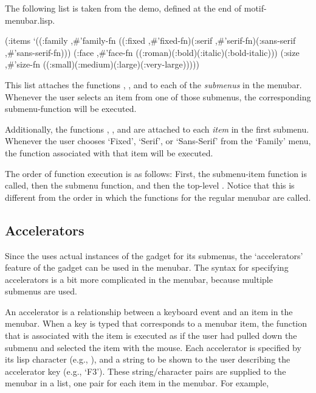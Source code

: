 The following  list is taken from the  demo,
defined at the end of motif-menubar.lisp.

\begin{programexample}
(:items
 `((:family ,\#'family-fn
	    ((:fixed ,\#'fixed-fn)(:serif ,\#'serif-fn)(:sans-serif ,\#'sans-serif-fn)))
   (:face ,\#'face-fn
	  ((:roman)(:bold)(:italic)(:bold-italic)))
   (:size ,\#'size-fn
	  ((:small)(:medium)(:large)(:very-large)))))
\end{programexample}

This  list attaches the functions ,
, and  to each of the {\it submenus}
in the menubar.  Whenever the user selects an item from one of those submenus,
the corresponding submenu-function will be executed.

Additionally, the functions , ,
and  are attached to each {\it item} in the first
submenu.  Whenever the user chooses `Fixed', `Serif', or `Sans-Serif' from
the `Family' menu, the function associated with that item will be executed.

The order of function execution is as follows:  First, the submenu-item
function is called, then the submenu function, and then the top-level
.  Notice that this is different from the order in
which the functions for the regular menubar are called.


\subsection{Accelerators}
\label{mmbar-accelerators}

Since the  uses actual instances of the 
gadget for its submenus, the `accelerators' feature of the 
gadget can be used in the menubar.  The syntax for specifying accelerators
is a bit more complicated in the menubar, because multiple submenus are used.

An accelerator is a relationship between a keyboard event and an item in
the menubar.  When a key is typed that corresponds to a menubar item, the
function that is associated with the item is executed as if the user had
pulled down the submenu and selected the item with the mouse.  Each accelerator
is specified by its lisp character (e.g., ), and a string to be shown
to the user describing the accelerator key (e.g., `F3').  These
string/character
pairs are supplied to the menubar in a list, one pair for each item in the
menubar.  For example,

